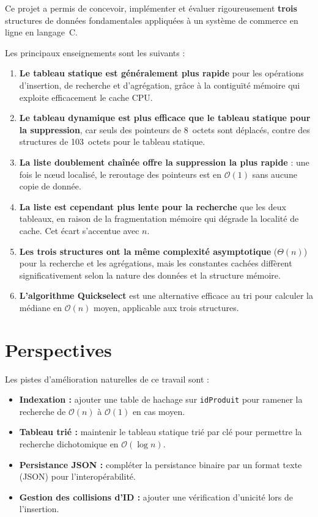 \documentclass[12pt,a4paper]{report}
\begin{document}
Ce projet a permis de concevoir, implémenter et évaluer rigoureusement \textbf{trois} structures de données fondamentales appliquées à un système de commerce en ligne en langage~C.

Les principaux enseignements sont les suivants :

\begin{enumerate}
    \item \textbf{Le tableau statique est généralement plus rapide} pour les opérations d'insertion, de recherche et d'agrégation, grâce à la contiguïté mémoire qui exploite efficacement le cache CPU.

    \item \textbf{Le tableau dynamique est plus efficace que le tableau statique pour la suppression}, car seuls des pointeurs de 8~octets sont déplacés, contre des structures de 103~octets pour le tableau statique.

    \item \textbf{La liste doublement chaînée offre la suppression la plus rapide} : une fois le nœud localisé, le reroutage des pointeurs est en $\mathcal{O}(1)$ sans aucune copie de donnée.

    \item \textbf{La liste est cependant plus lente pour la recherche} que les deux tableaux, en raison de la fragmentation mémoire qui dégrade la localité de cache. Cet écart s'accentue avec $n$.

    \item \textbf{Les trois structures ont la même complexité asymptotique} ($\Theta(n)$) pour la recherche et les agrégations, mais les constantes cachées diffèrent significativement selon la nature des données et la structure mémoire.

    \item \textbf{L'algorithme Quickselect} est une alternative efficace au tri pour calculer la médiane en $\mathcal{O}(n)$ moyen, applicable aux trois structures.
\end{enumerate}

\section{Perspectives}

Les pistes d'amélioration naturelles de ce travail sont :

\begin{itemize}
    \item \textbf{Indexation :} ajouter une table de hachage sur \texttt{idProduit} pour ramener la recherche de $\mathcal{O}(n)$ à $\mathcal{O}(1)$ en cas moyen.
    \item \textbf{Tableau trié :} maintenir le tableau statique trié par clé pour permettre la recherche dichotomique en $\mathcal{O}(\log n)$.
    \item \textbf{Persistance JSON :} compléter la persistance binaire par un format texte (JSON) pour l'interopérabilité.
    \item \textbf{Gestion des collisions d'ID :} ajouter une vérification d'unicité lors de l'insertion.
\end{itemize}
\end{document}
